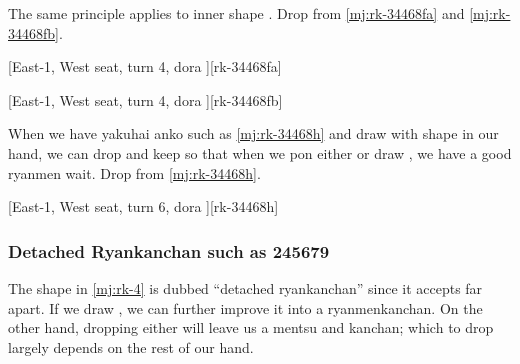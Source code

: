 \documentclass[12pt]{article}
\begin{document}
The same principle applies to inner  shape \citep{yuusee-34468}. Drop  from \ref{mj:rk-34468fa} and \ref{mj:rk-34468fb}.

[East-1, West seat, turn 4, dora ][rk-34468fa]

[East-1, West seat, turn 4, dora ][rk-34468fb]

%
%

When we have yakuhai anko such as \ref{mj:rk-34468h} and draw  with  shape in our hand, we can drop  and keep  so that when we pon either  or draw , we have a good ryanmen wait. Drop  from \ref{mj:rk-34468h}.

[East-1, West seat, turn 6, dora ][rk-34468h]


\subsubsection*{Detached Ryankanchan such as 245679}

The  shape in \ref{mj:rk-4} is dubbed ``detached ryankanchan'' since it accepts  far apart. If we draw , we can further improve it into a ryanmenkanchan. On the other hand, dropping either  will leave us a mentsu and kanchan; which to drop largely depends on the rest of our hand.
\end{document}

